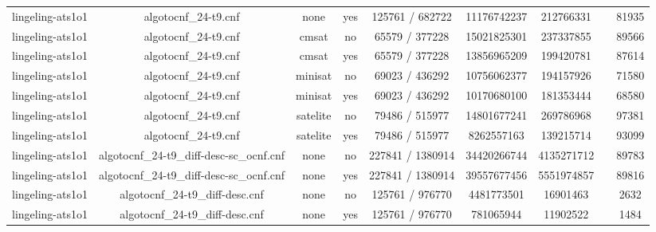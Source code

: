 \begin{appendices}
\begin{table}[p]
\begin{center}
\begin{tabular}{l|cccccccc}
  lingeling-ats1o1               & algotocnf\_24-t9.cnf           & none       & yes   & 125761 / 682722 & 11176742237 & 212766331 &            & 81935 \\ %
  lingeling-ats1o1               & algotocnf\_24-t9.cnf           & cmsat      & no    & 65579 / 377228 & 15021825301 & 237337855 &            & 89566 \\ %
  lingeling-ats1o1               & algotocnf\_24-t9.cnf           & cmsat      & yes   & 65579 / 377228 & 13856965209 & 199420781 &            & 87614 \\ %
  lingeling-ats1o1               & algotocnf\_24-t9.cnf           & minisat    & no    & 69023 / 436292 & 10756062377 & 194157926 &            & 71580 \\ %
  lingeling-ats1o1               & algotocnf\_24-t9.cnf           & minisat    & yes   & 69023 / 436292 & 10170680100 & 181353444 &            & 68580 \\ %
  lingeling-ats1o1               & algotocnf\_24-t9.cnf           & satelite   & no    & 79486 / 515977 & 14801677241 & 269786968 &            & 97381 \\ %
  lingeling-ats1o1               & algotocnf\_24-t9.cnf           & satelite   & yes   & 79486 / 515977 & 8262557163 & 139215714 &            & 93099 \\ %
  lingeling-ats1o1               & algotocnf\_24-t9\_diff-desc-sc\_ocnf.cnf & none       & no    & 227841 / 1380914 & 34420266744 & 4135271712 &            & 89783 \\ %
  lingeling-ats1o1               & algotocnf\_24-t9\_diff-desc-sc\_ocnf.cnf & none       & yes   & 227841 / 1380914 & 39557677456 & 5551974857 &            & 89816 \\ %
  lingeling-ats1o1               & algotocnf\_24-t9\_diff-desc.cnf & none       & no    & 125761 / 976770 & 4481773501 & 16901463  &            & 2632 \\ %
  lingeling-ats1o1               & algotocnf\_24-t9\_diff-desc.cnf & none       & yes   & 125761 / 976770 & 781065944 & 11902522  &            & 1484 \\ %

\end{tabular}
\end{center}
\end{table}
\end{appendices}

